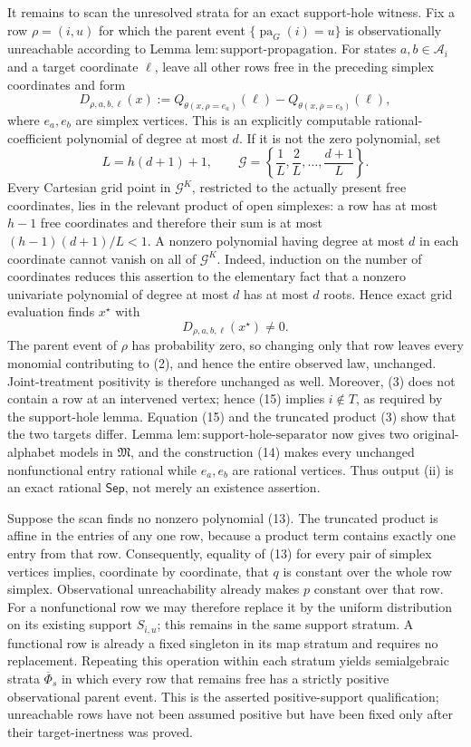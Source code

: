 It remains to scan the unresolved strata for an exact support-hole witness. Fix a row \(\rho=(i,u)\) for which the parent event \(\{\operatorname{pa}_G(i)=u\}\) is observationally unreachable according to Lemma \(\mathrm{lem:support\text{-}propagation}\). For states \(a,b\in\mathcal A_i\) and a target coordinate \(\ell\), leave all other rows free in the preceding simplex coordinates and form
\[
 D_{\rho,a,b,\ell}(x)
 :=Q_{\theta(x,\rho=e_a)}(\ell)
   -Q_{\theta(x,\rho=e_b)}(\ell),
 \tag{13}
\]
where \(e_a,e_b\) are simplex vertices. This is an explicitly computable rational-coefficient polynomial of degree at most \(d\). If it is not the zero polynomial, set
\[
 L=h(d+1)+1,
 \qquad
 \mathcal G=\left\{\frac1L,\frac2L,\ldots,\frac{d+1}{L}\right\}.
 \tag{14}
\]
Every Cartesian grid point in \(\mathcal G^K\), restricted to the actually present free coordinates, lies in the relevant product of open simplexes: a row has at most \(h-1\) free coordinates and therefore their sum is at most \((h-1)(d+1)/L<1\). A nonzero polynomial having degree at most \(d\) in each coordinate cannot vanish on all of \(\mathcal G^K\). Indeed, induction on the number of coordinates reduces this assertion to the elementary fact that a nonzero univariate polynomial of degree at most \(d\) has at most \(d\) roots. Hence exact grid evaluation finds \(x^\star\) with
\[
 D_{\rho,a,b,\ell}(x^\star)\ne0.
 \tag{15}
\]
The parent event of \(\rho\) has probability zero, so changing only that row leaves every monomial contributing to (2), and hence the entire observed law, unchanged. Joint-treatment positivity is therefore unchanged as well. Moreover, (3) does not contain a row at an intervened vertex; hence (15) implies \(i\notin T\), as required by the support-hole lemma. Equation (15) and the truncated product (3) show that the two targets differ. Lemma \(\mathrm{lem:support\text{-}hole\text{-}separator}\) now gives two original-alphabet models in \(\mathfrak M\), and the construction (14) makes every unchanged nonfunctional entry rational while \(e_a,e_b\) are rational vertices. Thus output (ii) is an exact rational \(\mathsf{Sep}\), not merely an existence assertion.

Suppose the scan finds no nonzero polynomial (13). The truncated product is affine in the entries of any one row, because a product term contains exactly one entry from that row. Consequently, equality of (13) for every pair of simplex vertices implies, coordinate by coordinate, that \(q\) is constant over the whole row simplex. Observational unreachability already makes \(p\) constant over that row. For a nonfunctional row we may therefore replace it by the uniform distribution on its existing support \(S_{i,u}\); this remains in the same support stratum. A functional row is already a fixed singleton in its map stratum and requires no replacement. Repeating this operation within each stratum yields semialgebraic strata \(\overline\Phi_s\) in which every row that remains free has a strictly positive observational parent event. This is the asserted positive-support qualification; unreachable rows have not been assumed positive but have been fixed only after their target-inertness was proved.

